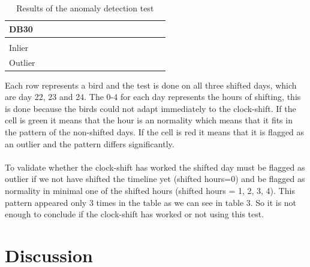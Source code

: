 \documentclass[a4paper]{article}
\begin{document}
\begin{table}[H]
\begin{tabular}{llllllllllllllll}
\multicolumn{1}{|l|}{\textbf{DB30}} & \multicolumn{1}{l|}{\cellcolor[HTML]{FD6864}} & \multicolumn{1}{l|}{\cellcolor[HTML]{FD6864}} & \multicolumn{1}{l|}{\cellcolor[HTML]{FD6864}} & \multicolumn{1}{l|}{\cellcolor[HTML]{FD6864}} & \multicolumn{1}{l|}{\cellcolor[HTML]{FD6864}} & \multicolumn{1}{l|}{\cellcolor[HTML]{FD6864}} & \multicolumn{1}{l|}{\cellcolor[HTML]{FD6864}} & \multicolumn{1}{l|}{\cellcolor[HTML]{FD6864}} & \multicolumn{1}{l|}{\cellcolor[HTML]{FD6864}} & \multicolumn{1}{l|}{\cellcolor[HTML]{FD6864}} & \multicolumn{1}{l|}{\cellcolor[HTML]{FD6864}} & \multicolumn{1}{l|}{\cellcolor[HTML]{FD6864}} & \multicolumn{1}{l|}{\cellcolor[HTML]{FD6864}} & \multicolumn{1}{l|}{\cellcolor[HTML]{FD6864}} & \multicolumn{1}{l|}{\cellcolor[HTML]{FD6864}} \\ \hline
\multicolumn{16}{l}{} \\ \hline
\multicolumn{1}{|l|}{Inlier} & \multicolumn{15}{l|}{\cellcolor[HTML]{67FD9A}} \\ \hline
\multicolumn{1}{|l|}{Outlier} & \multicolumn{15}{l|}{\cellcolor[HTML]{FD6864}} \\ \hline
\end{tabular}
\caption{Results of the anomaly detection test}
\label{my-label}
\end{table}
Each row represents a bird and the test is done on all three shifted days, which are day 22, 23 and 24. The 0-4 for each day represents the hours of shifting, this is done because the birds could not adapt immediately to the clock-shift. If the cell is green it means that the hour is an normality which means that it fits in the pattern of the non-shifted days. If the cell is red it means that it is flagged as an outlier and the pattern differs significantly.\\\\
To validate whether the clock-shift has worked the shifted day must be flagged as outlier if we not have shifted the timeline yet (shifted hours=0) and be flagged as normality in minimal one of the shifted hours (shifted hours = 1, 2, 3, 4). This pattern appeared only 3 times in the table as we can see in table 3. So it is not enough to conclude if the clock-shift has worked or not using this test. 


\section*{Discussion}
\end{document}
